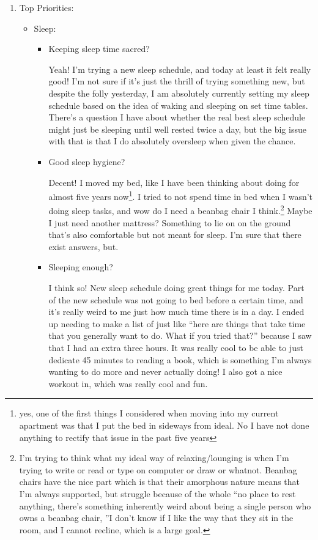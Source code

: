 \documentclass[12pt]{article}
\newcommand{\say}[1]{``#1''}
\renewcommand{\,}{\textsuperscript{,}}
\begin{document}
\begin{enumerate}

\item Top Priorities:

\begin{itemize}

\item Sleep:

\begin{itemize}

\item Keeping sleep time sacred?

Yeah! I'm trying a new sleep schedule, and today at least it felt really good!  
I'm not sure if it's just the thrill of trying something new, but despite the folly yesterday, I am absolutely currently setting my sleep schedule based on the idea of waking and sleeping on set time tables. There's a question I have about whether the real best sleep schedule might just be sleeping until well rested twice a day, but the big issue with that is that I do absolutely oversleep when given the chance.

\item Good sleep hygiene?

Decent!  
I moved my bed, like I have been thinking about doing for almost five years now\footnote{yes, one of the first things I considered when moving into my current apartment was that I put the bed in sideways from ideal. No I have not done anything to rectify that issue in the past five years}.  
I tried to not spend time in bed when I wasn't doing sleep tasks, and wow do I need a beanbag chair I think.\footnote{I'm trying to think what my ideal way of relaxing/lounging is when I'm trying to write or read or type on computer or draw or whatnot. Beanbag chairs have the nice part which is that their amorphous nature means that I'm always supported, but struggle because of the whole \say{no place to rest anything, there's something inherently weird about being a single person who owns a beanbag chair, }I don't know if I like the way that they sit in the room, and I cannot recline, which is a large goal.} Maybe I just need another mattress? Something to lie on on the ground that's also comfortable but not meant for sleep. I'm sure that there exist answers, but.

\item Sleeping enough?

I think so! New sleep schedule doing great things for me today.  
Part of the new schedule was not going to bed before a certain time, and it's really weird to me just how much time there is in a day. I ended up needing to make a list of just like \say{here are things that take time that you generally want to do. What if you tried that?} because I saw that I had an extra three hours.  
It was really cool to be able to just dedicate 45 minutes to reading a book, which is something I'm always wanting to do more and never actually doing!  
I also got a nice workout in, which was really cool and fun.


\end{itemize}
\end{itemize}
\end{enumerate}
\end{document}
